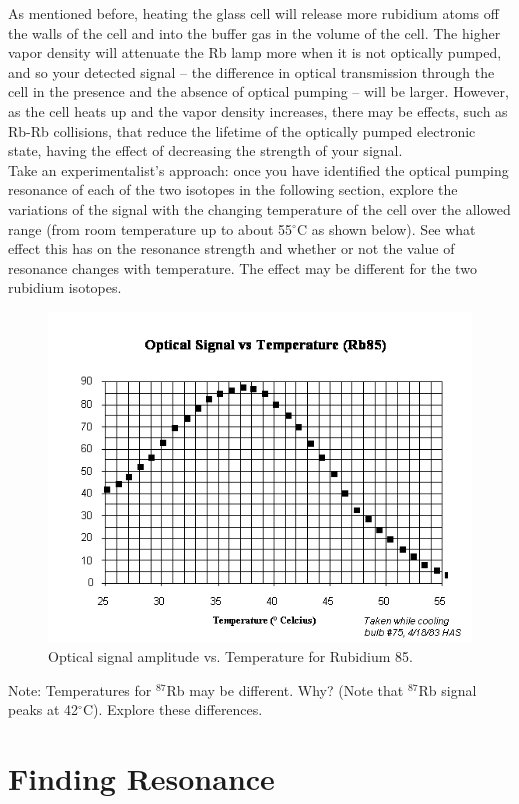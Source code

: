 \documentclass{../lab}
\begin{document}
As mentioned before, heating the glass cell will release more rubidium atoms off the walls of the cell and into the buffer gas in the volume of the cell. The higher vapor density will attenuate the Rb lamp more when it is not optically pumped, and so your detected signal -- the difference in optical transmission through the cell in the presence and the absence of optical pumping -- will be larger. However, as the cell heats up and the vapor density increases, there may be effects, such as Rb-Rb collisions, that reduce the lifetime of the optically pumped electronic state, having the effect of decreasing the strength of your signal. \\

Take an experimentalist's approach: once you have identified the optical pumping resonance of each of the two isotopes in the following section, explore the variations of the signal with the changing temperature of the cell over the allowed range (from room temperature up to about 55$^\circ$C as shown below). See what effect this has on the resonance strength and whether or not the value of resonance changes with temperature. The effect may be different for the two rubidium isotopes.

    \begin{figure}[h]
        \centering
        \includegraphics[width=0.8\linewidth]{images/SigVsTemp}
        \caption{Optical signal amplitude vs. Temperature for Rubidium 85.}
    \end{figure}

\noindent Note: Temperatures for $^{87}$Rb may be different. Why? (Note that $^{87}$Rb signal peaks at 42$^\circ$C). Explore these differences.

\section{Finding Resonance}
\end{document}
